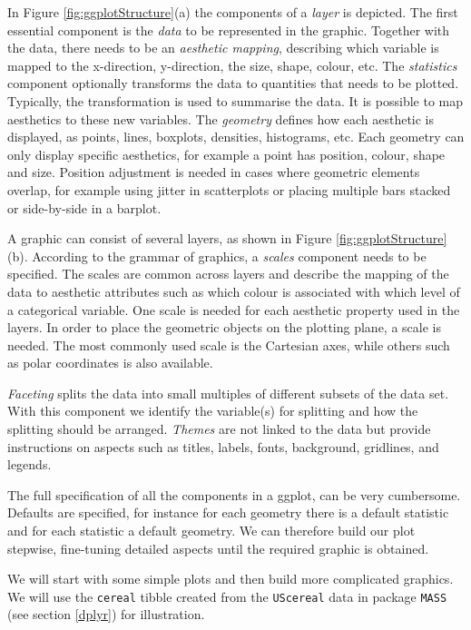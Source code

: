 \documentclass[
]{book}
\begin{document}
In Figure \ref{fig:ggplotStructure}(a) the components of a \emph{{layer}} is depicted. The first essential component is the \emph{{data}} to be represented in the graphic. Together with the data, there needs to be an \emph{{aesthetic mapping}}, describing which variable is mapped to the x-direction, y-direction, the size, shape, colour, etc. The \emph{{statistics}} component optionally transforms the data to quantities that needs to be plotted. Typically, the transformation is used to summarise the data. It is possible to map aesthetics to these new variables. The \emph{{geometry}} defines how each aesthetic is displayed, as points, lines, boxplots, densities, histograms, etc. Each geometry can only display specific aesthetics, for example a point has position, colour, shape and size. Position adjustment is needed in cases where geometric elements overlap, for example using jitter in scatterplots or placing multiple bars stacked or side-by-side in a barplot.

A graphic can consist of several layers, as shown in Figure \ref{fig:ggplotStructure}(b). According to the grammar of graphics, a \emph{{scales}} component needs to be specified. The scales are common across layers and describe the mapping of the data to aesthetic attributes such as which colour is associated with which level of a categorical variable. One scale is needed for each aesthetic property used in the layers. In order to place the geometric objects on the plotting plane, a scale is needed. The most commonly used scale is the Cartesian axes, while others such as polar coordinates is also available.

\emph{{Faceting}} splits the data into small multiples of different subsets of the data set. With this component we identify the variable(s) for splitting and how the splitting should be arranged. \emph{{Themes}} are not linked to the data but provide instructions on aspects such as titles, labels, fonts, background, gridlines, and legends.

The full specification of all the components in a ggplot, can be very cumbersome. Defaults are specified, for instance for each geometry there is a default statistic and for each statistic a default geometry. We can therefore build our plot stepwise, fine-tuning detailed aspects until the required graphic is obtained.

We will start with some simple plots and then build more complicated graphics. We will use the \texttt{cereal} tibble created from the \texttt{UScereal} data in package \texttt{MASS} (see section \ref{dplyr}) for illustration.
\end{document}
